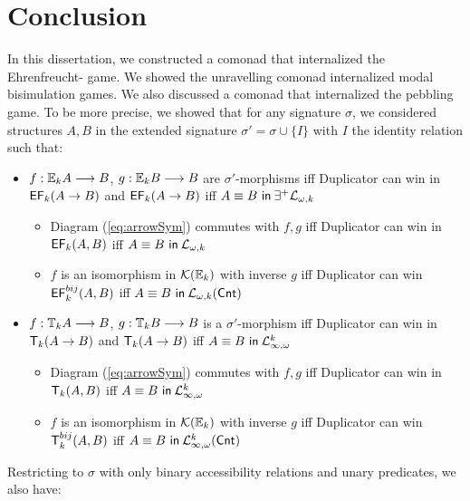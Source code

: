 \chapter{Conclusion}
In this dissertation, we constructed a comonad that internalized the Ehrenfreucht-{\Fraisse} game. We showed the unravelling comonad internalized modal bisimulation games. We also discussed a comonad that internalized the pebbling game. To be more precise, we showed that for any signature $\sigma$, we considered structures $A,B$ in the extended signature $\sigma' = \sigma \cup \{I\}$ with $I$ the identity relation such that: 
\begin{itemize}
\item $f:{\mathbb{E}_{k}A} \longrightarrow B$, $g:{\mathbb{E}_{k}B} \longrightarrow B$ are $\sigma'$-morphisms iff Duplicator can win in ${\mathsf{EF}_{k}(A \rightarrow B)}$ and ${\mathsf{EF}_{k}(A \rightarrow B)}$ iff ${A \equiv B \ \mathsf{in}\: \exists^{+}\mathcal{L}_{\omega,k}}$
    \begin{itemize}
        \item Diagram (\ref{eq:arrowSym}) commutes with $f,g$ iff Duplicator can win in ${\mathsf{EF}_{k}(A,B)}$ iff ${A \equiv B \ \mathsf{in}\: \mathcal{L}_{\omega,k}}$
        \item $f$ is an isomorphism in $\mathcal{K}({\mathbb{E}_{k}})$ with inverse $g$ iff Duplicator can win ${\mathsf{EF}^{bij}_{k}(A,B)}$ iff ${A \equiv B \ \mathsf{in}\: \mathcal{L}_{\omega,k}(\mathsf{Cnt})}$
    \end{itemize}
\item $f:{\mathbb{T}_{k}A} \longrightarrow B$, $g:{\mathbb{T}_{k}B} \longrightarrow B$ is a $\sigma'$-morphism iff Duplicator can win in ${\mathsf{T}_{k}(A \rightarrow B)}$ and ${\mathsf{T}_{k}(A \rightarrow B)}$ iff ${A \equiv B \ \mathsf{in}\: \mathcal{L}^{k}_{\infty,\omega}}$
    \begin{itemize}
        \item Diagram (\ref{eq:arrowSym}) commutes with $f,g$ iff Duplicator can win in ${\mathsf{T}_{k}(A,B)}$ iff ${A \equiv B \ \mathsf{in}\: \mathcal{L}^{k}_{\infty,\omega}}$
        \item $f$ is an isomorphism in $\mathcal{K}({\mathbb{E}_{k}})$ with inverse $g$ iff Duplicator can win ${\mathsf{T}^{bij}_{k}(A,B)}$ iff ${A \equiv B \ \mathsf{in}\: \mathcal{L}^{k}_{\infty,\omega}(\mathsf{Cnt})}$
    \end{itemize}
\end{itemize}
Restricting to $\sigma$ with only binary accessibility relations and unary predicates, we also have: 
